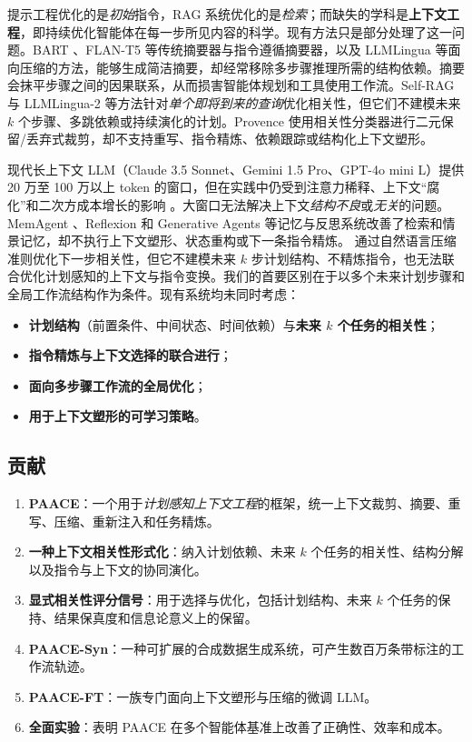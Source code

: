 \documentclass[10pt,twocolumn]{article}
\begin{document}
提示工程优化的是\emph{初始}指令，RAG 系统优化的是\emph{检索}；而缺失的学科是\textbf{上下文工程}，即持续优化智能体在每一步所见内容的科学。现有方法只是部分处理了这一问题。BART \citep{lewis2019bart}、FLAN-T5 \citep{chung2022flan} 等传统摘要器与指令遵循摘要器，以及 LLMLingua \citep{jiang2023llmlingua} 等面向压缩的方法，能够生成简洁摘要，却经常移除多步骤推理所需的结构依赖。摘要会抹平步骤之间的因果联系，从而损害智能体规划和工具使用工作流。Self-RAG \citep{asai2024selfrag} 与 LLMLingua-2 \citep{jiang2024llmlingua2} 等方法针对\emph{单个即将到来的查询}优化相关性，但它们不建模未来 $k$ 个步骤、多跳依赖或持续演化的计划。Provence \citep{wu2024provence} 使用相关性分类器进行二元保留/丢弃式裁剪，却不支持重写、指令精炼、依赖跟踪或结构化上下文塑形。

现代长上下文 LLM（Claude 3.5 Sonnet、Gemini 1.5 Pro、GPT-4o mini L）提供 20 万至 100 万以上 token 的窗口，但在实践中仍受到注意力稀释、上下文“腐化”和二次方成本增长的影响 \citep{zaheer2020bigbird,guo2021longt5}。大窗口无法解决上下文\emph{结构不良}或\emph{无关}的问题。MemAgent \citep{yu2025memagent}、Reflexion \citep{shinn2023reflexion} 和 Generative Agents \citep{park2023generative} 等记忆与反思系统改善了检索和情景记忆，却不执行上下文塑形、状态重构或下一条指令精炼。\citet{acon2025yu} 通过自然语言压缩准则优化下一步相关性，但它不建模未来 $k$ 步计划结构、不精炼指令，也无法联合优化计划感知的上下文与指令变换。我们的首要区别在于以多个未来计划步骤和全局工作流结构作为条件。现有系统均未同时考虑：
\begin{itemize}
  \item \textbf{计划结构}（前置条件、中间状态、时间依赖）与\textbf{未来 $k$ 个任务的相关性}；
  \item \textbf{指令精炼与上下文选择的联合进行}；
  \item \textbf{面向多步骤工作流的全局优化}；
  \item \textbf{用于上下文塑形的可学习策略}。
\end{itemize}

\subsection*{贡献}

\begin{enumerate}
  \item \textbf{PAACE}：一个用于\emph{计划感知上下文工程}的框架，统一上下文裁剪、摘要、重写、压缩、重新注入和任务精炼。
  \item \textbf{一种上下文相关性形式化}：纳入计划依赖、未来 $k$ 个任务的相关性、结构分解以及指令与上下文的协同演化。
  \item \textbf{显式相关性评分信号}：用于选择与优化，包括计划结构、未来 $k$ 个任务的保持、结果保真度和信息论意义上的保留。
  \item \textbf{PAACE-Syn}：一种可扩展的合成数据生成系统，可产生数百万条带标注的工作流轨迹。
  \item \textbf{PAACE-FT}：一族专门面向上下文塑形与压缩的微调 LLM。
  \item \textbf{全面实验}：表明 PAACE 在多个智能体基准上改善了正确性、效率和成本。
\end{enumerate}
\end{document}
